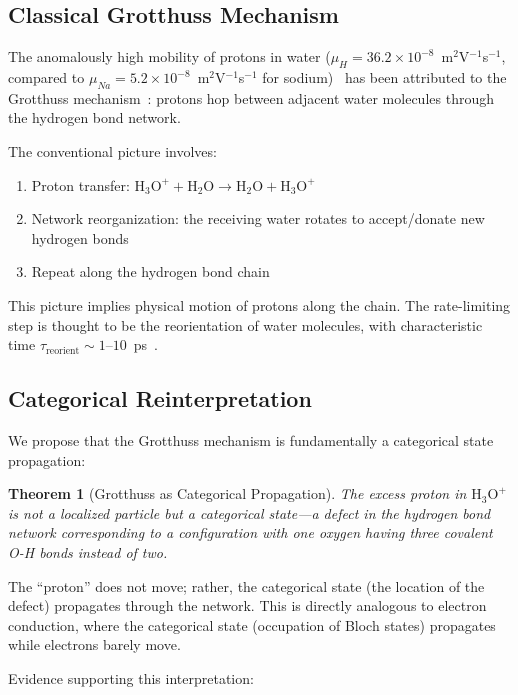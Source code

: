 \documentclass[twocolumn,showpacs,preprintnumbers,amsmath,amssymb,prd]{revtex4-2}
\newtheorem{theorem}{Theorem}[section]
\begin{document}
\subsection{Classical Grotthuss Mechanism}

The anomalously high mobility of protons in water ($\mu_H = 36.2 \times 10^{-8}$~m$^2$V$^{-1}$s$^{-1}$, compared to $\mu_{Na} = 5.2 \times 10^{-8}$~m$^2$V$^{-1}$s$^{-1}$ for sodium)~\cite{Atkins2014} has been attributed to the Grotthuss mechanism~\cite{Grotthuss1806}: protons hop between adjacent water molecules through the hydrogen bond network.

The conventional picture involves:
\begin{enumerate}
\item Proton transfer: $\text{H}_3\text{O}^+ + \text{H}_2\text{O} \to \text{H}_2\text{O} + \text{H}_3\text{O}^+$
\item Network reorganization: the receiving water rotates to accept/donate new hydrogen bonds
\item Repeat along the hydrogen bond chain
\end{enumerate}

This picture implies physical motion of protons along the chain. The rate-limiting step is thought to be the reorientation of water molecules, with characteristic time $\tau_{\text{reorient}} \sim 1$--$10$~ps~\cite{Laage2006}.

\subsection{Categorical Reinterpretation}

We propose that the Grotthuss mechanism is fundamentally a categorical state propagation:

\begin{theorem}[Grotthuss as Categorical Propagation]
\label{thm:grotthuss}
The excess proton in $\text{H}_3\text{O}^+$ is not a localized particle but a categorical state---a defect in the hydrogen bond network corresponding to a configuration with one oxygen having three covalent O-H bonds instead of two.
\end{theorem}

The ``proton'' does not move; rather, the categorical state (the location of the defect) propagates through the network. This is directly analogous to electron conduction, where the categorical state (occupation of Bloch states) propagates while electrons barely move.

Evidence supporting this interpretation:
\end{document}

